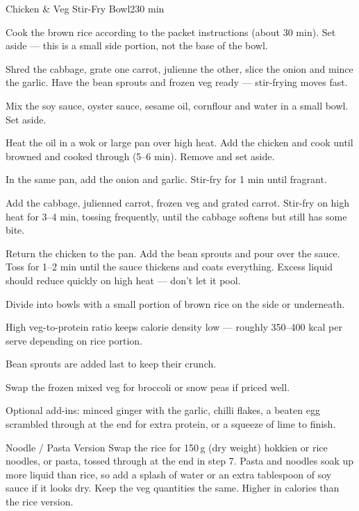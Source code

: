 \begin{recipebox}{Chicken \& Veg Stir-Fry Bowl}{2}{30 min}
\begin{method}
  \item Cook the brown rice according to the packet instructions (about 30 min). Set aside --- this is a small side portion, not the base of the bowl.
  \item Shred the cabbage, grate one carrot, julienne the other, slice the onion and mince the garlic. Have the bean sprouts and frozen veg ready --- stir-frying moves fast.
  \item Mix the soy sauce, oyster sauce, sesame oil, cornflour and water in a small bowl. Set aside.
  \item Heat the oil in a wok or large pan over high heat. Add the chicken and cook until browned and cooked through (5--6 min). Remove and set aside.
  \item In the same pan, add the onion and garlic. Stir-fry for 1 min until fragrant.
  \item Add the cabbage, julienned carrot, frozen veg and grated carrot. Stir-fry on high heat for 3--4 min, tossing frequently, until the cabbage softens but still has some bite.
  \item Return the chicken to the pan. Add the bean sprouts and pour over the sauce. Toss for 1--2 min until the sauce thickens and coats everything. Excess liquid should reduce quickly on high heat --- don't let it pool.
  \item Divide into bowls with a small portion of brown rice on the side or underneath.
\end{method}

\begin{notelist}
  \item High veg-to-protein ratio keeps calorie density low --- roughly 350--400 kcal per serve depending on rice portion.
  \item Bean sprouts are added last to keep their crunch.
  \item Swap the frozen mixed veg for broccoli or snow peas if priced well.
  \item Optional add-ins: minced ginger with the garlic, chilli flakes, a beaten egg scrambled through at the end for extra protein, or a squeeze of lime to finish.
\end{notelist}

\begin{variationbox}{Noodle / Pasta Version}
Swap the rice for 150\,g (dry weight) hokkien or rice noodles, or pasta, tossed through at the end in step 7. Pasta and noodles soak up more liquid than rice, so add a splash of water or an extra tablespoon of soy sauce if it looks dry. Keep the veg quantities the same. Higher in calories than the rice version.
\end{variationbox}

\end{recipebox}
